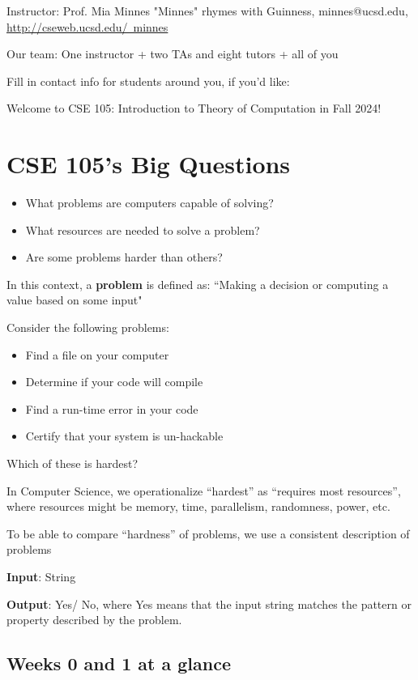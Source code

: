 Instructor: Prof. Mia Minnes {\tiny{"Minnes" rhymes with Guinness}}, minnes@ucsd.edu, 
\href{http://cseweb.ucsd.edu/~minnes}{http://cseweb.ucsd.edu/~minnes}


Our team: One instructor + two TAs and eight tutors + all of you

Fill in contact info for students around you, if you'd like:


\vfill

\newpage 
Welcome to CSE 105: Introduction to Theory of Computation in Fall 2024!

\section*{CSE 105's Big Questions}
\begin{itemize}
   \item What problems are computers capable of solving?
   \item What resources are needed to solve a problem?
   \item Are some problems harder than others?
\end{itemize}

In this context, a {\bf problem} is defined as: ``Making a decision or computing a value based on some input"

Consider the following problems: 
\begin{itemize}
   \item Find a file on your computer
   \item Determine if your code will compile
   \item Find a run-time error in your code
   \item Certify that your system is un-hackable
\end{itemize}

Which of these is hardest?

\vfill

In Computer Science, we operationalize ``hardest'' as ``requires most resources'', where
resources might be memory, time, parallelism, randomness, power, etc.

To be able to compare ``hardness'' of problems, we use a consistent description of problems

{\bf Input}: String

{\bf Output}: Yes/ No, where Yes means that the input string matches the pattern or property described by the problem.

\newpage

\subsection*{Weeks 0 and 1 at a glance}


